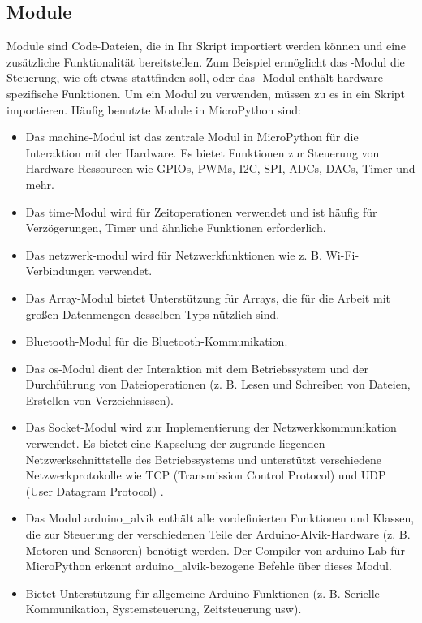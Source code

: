 \subsection{Module}
Module sind Code-Dateien, die in Ihr Skript importiert werden können und eine zusätzliche Funktionalität bereitstellen. Zum Beispiel ermöglicht das -Modul die Steuerung, wie oft etwas stattfinden soll, oder das -Modul enthält hardware-spezifische Funktionen. Um ein Modul zu verwenden, müssen zu es in ein Skript importieren. Häufig benutzte Module in MicroPython sind:
\begin{itemize}
	\item {} Das machine-Modul ist das zentrale Modul in MicroPython für die Interaktion mit der Hardware. Es bietet Funktionen zur Steuerung von Hardware-Ressourcen wie GPIOs, PWMs, I2C, SPI, ADCs, DACs, Timer und mehr.
	\item {} Das time-Modul wird für Zeitoperationen verwendet und ist häufig für Verzögerungen, Timer und ähnliche Funktionen erforderlich.
	\item {} Das netzwerk-modul wird für Netzwerkfunktionen wie z. B. Wi-Fi-Verbindungen verwendet.
	\item {} Das Array-Modul bietet Unterstützung für Arrays, die für die Arbeit mit gro\ss en Datenmengen desselben Typs nützlich sind.
	\item {} Bluetooth-Modul für die Bluetooth-Kommunikation.
	\item {} Das os-Modul dient der Interaktion mit dem Betriebssystem und der Durchführung von Dateioperationen (z. B. Lesen und Schreiben von Dateien, Erstellen von Verzeichnissen).
	\item {} Das Socket-Modul wird zur Implementierung der Netzwerkkommunikation verwendet. Es bietet eine Kapselung der zugrunde liegenden Netzwerkschnittstelle des Betriebssystems und unterstützt verschiedene Netzwerkprotokolle wie TCP (Transmission Control Protocol) und UDP (User Datagram Protocol) \cite{MicroPython:2025}.
	\item {} Das Modul arduino\_alvik enthält alle vordefinierten Funktionen und Klassen, die zur Steuerung der verschiedenen Teile der Arduino-Alvik-Hardware (z. B. Motoren und Sensoren) benötigt werden. Der Compiler von arduino Lab für MicroPython erkennt arduino\_alvik-bezogene Befehle über dieses Modul.
	\item {} Bietet Unterstützung für allgemeine Arduino-Funktionen (z. B. Serielle Kommunikation, Systemsteuerung, Zeitsteuerung usw). \cite{Maik:2021}
\end{itemize}

